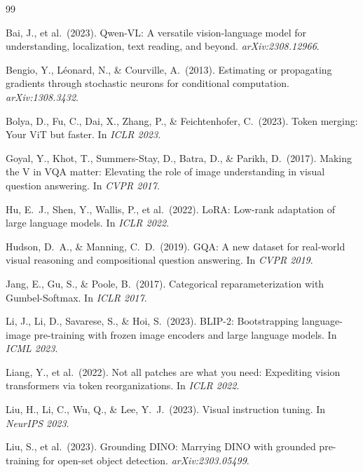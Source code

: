 \documentclass[11pt,a4paper]{article}
\begin{document}
\begin{thebibliography}{99}

Bai, J., et al.\ (2023).
\newblock Qwen-VL: A versatile vision-language model for understanding,
  localization, text reading, and beyond.
\newblock \textit{arXiv:2308.12966}.

Bengio, Y., L\'{e}onard, N., \& Courville, A.\ (2013).
\newblock Estimating or propagating gradients through stochastic neurons for
  conditional computation.
\newblock \textit{arXiv:1308.3432}.

Bolya, D., Fu, C., Dai, X., Zhang, P., \& Feichtenhofer, C.\ (2023).
\newblock Token merging: Your ViT but faster.
\newblock In \textit{ICLR 2023}.

Goyal, Y., Khot, T., Summers-Stay, D., Batra, D., \& Parikh, D.\ (2017).
\newblock Making the V in VQA matter: Elevating the role of image understanding
  in visual question answering.
\newblock In \textit{CVPR 2017}.

Hu, E.~J., Shen, Y., Wallis, P., et al.\ (2022).
\newblock LoRA: Low-rank adaptation of large language models.
\newblock In \textit{ICLR 2022}.

Hudson, D.~A., \& Manning, C.~D.\ (2019).
\newblock GQA: A new dataset for real-world visual reasoning and compositional
  question answering.
\newblock In \textit{CVPR 2019}.

Jang, E., Gu, S., \& Poole, B.\ (2017).
\newblock Categorical reparameterization with Gumbel-Softmax.
\newblock In \textit{ICLR 2017}.

Li, J., Li, D., Savarese, S., \& Hoi, S.\ (2023).
\newblock BLIP-2: Bootstrapping language-image pre-training with frozen image
  encoders and large language models.
\newblock In \textit{ICML 2023}.

Liang, Y., et al.\ (2022).
\newblock Not all patches are what you need: Expediting vision transformers via
  token reorganizations.
\newblock In \textit{ICLR 2022}.

Liu, H., Li, C., Wu, Q., \& Lee, Y.~J.\ (2023).
\newblock Visual instruction tuning.
\newblock In \textit{NeurIPS 2023}.

Liu, S., et al.\ (2023).
\newblock Grounding DINO: Marrying DINO with grounded pre-training for
  open-set object detection.
\newblock \textit{arXiv:2303.05499}.


\end{thebibliography}
\end{document}
